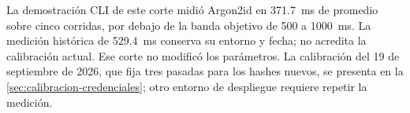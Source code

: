 La demostración CLI de este corte midió Argon2id en 371.7~ms de promedio sobre cinco corridas, por debajo de la banda objetivo de 500 a 1000~ms. La medición histórica de 529.4~ms conserva su entorno y fecha; no acredita la calibración actual. Ese corte no modificó los parámetros. La calibración del 19 de septiembre de 2026, que fija tres pasadas para los hashes nuevos, se presenta en la \cref{sec:calibracion-credenciales}; otro entorno de despliegue requiere repetir la medición.
